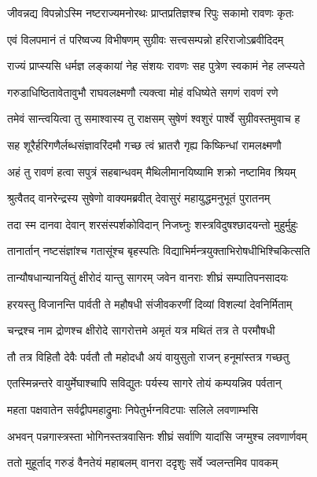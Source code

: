 \twolineshloka
{जीवन्नद्य विपन्नोऽस्मि नष्टराज्यमनोरथः}
{प्राप्तप्रतिज्ञश्च रिपुः सकामो रावणः कृतः} %

\twolineshloka
{एवं विलपमानं तं परिष्वज्य विभीषणम्}
{सुग्रीवः सत्त्वसम्पन्नो हरिराजोऽब्रवीदिदम्} %

\twolineshloka
{राज्यं प्राप्स्यसि धर्मज्ञ लङ्कायां नेह संशयः}
{रावणः सह पुत्रेण स्वकामं नेह लप्स्यते} %

\twolineshloka
{गरुडाधिष्ठितावेतावुभौ राघवलक्ष्मणौ}
{त्यक्त्वा मोहं वधिष्येते सगणं रावणं रणे} %

\twolineshloka
{तमेवं सान्त्वयित्वा तु समाश्वास्य तु राक्षसम्}
{सुषेणं श्वशुरं पार्श्वे सुग्रीवस्तमुवाच ह} %

\twolineshloka
{सह शूरैर्हरिगणैर्लब्धसंज्ञावरिंदमौ}
{गच्छ त्वं भ्रातरौ गृह्य किष्किन्धां रामलक्ष्मणौ} %

\twolineshloka
{अहं तु रावणं हत्वा सपुत्रं सहबान्धवम्}
{मैथिलीमानयिष्यामि शक्रो नष्टामिव श्रियम्} %

\twolineshloka
{श्रुत्वैतद् वानरेन्द्रस्य सुषेणो वाक्यमब्रवीत्}
{देवासुरं महायुद्धमनुभूतं पुरातनम्} %

\twolineshloka
{तदा स्म दानवा देवान् शरसंस्पर्शकोविदान्}
{निजघ्नुः शस्त्रविदुषश्छादयन्तो मुहुर्मुहुः} %

\twolineshloka
{तानार्तान् नष्टसंज्ञांश्च गतासूंश्च बृहस्पतिः}
{विद्याभिर्मन्त्रयुक्ताभिरोषधीभिश्चिकित्सति} %

\twolineshloka
{तान्यौषधान्यानयितुं क्षीरोदं यान्तु सागरम्}
{जवेन वानराः शीघ्रं सम्पातिपनसादयः} %

\twolineshloka
{हरयस्तु विजानन्ति पार्वती ते महौषधी}
{संजीवकरणीं दिव्यां विशल्यां देवनिर्मिताम्} %

\twolineshloka
{चन्द्रश्च नाम द्रोणश्च क्षीरोदे सागरोत्तमे}
{अमृतं यत्र मथितं तत्र ते परमौषधी} %

\twolineshloka
{तौ तत्र विहितौ देवैः पर्वतौ तौ महोदधौ}
{अयं वायुसुतो राजन् हनूमांस्तत्र गच्छतु} %

\twolineshloka
{एतस्मिन्नन्तरे वायुर्मेघाश्चापि सविद्युतः}
{पर्यस्य सागरे तोयं कम्पयन्निव पर्वतान्} %

\twolineshloka
{महता पक्षवातेन सर्वद्वीपमहाद्रुमाः}
{निपेतुर्भग्नविटपाः सलिले लवणाम्भसि} %

\twolineshloka
{अभवन् पन्नगास्त्रस्ता भोगिनस्तत्रवासिनः}
{शीघ्रं सर्वाणि यादांसि जग्मुश्च लवणार्णवम्} %

\twolineshloka
{ततो मुहूर्ताद् गरुडं वैनतेयं महाबलम्}
{वानरा ददृशुः सर्वे ज्वलन्तमिव पावकम्} %

